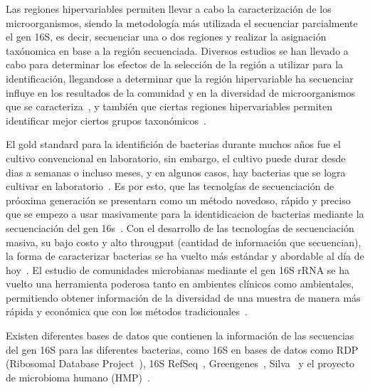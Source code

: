 Las regiones hipervariables permiten llevar a cabo la caracterización de los microorganismos, siendo la metodología más utilizada el secuenciar parcialmente el gen 16S, es decir, secuenciar una o dos regiones y realizar la asignación taxónomica en base a la región secuenciada. Diversos estudios se han llevado a cabo para determinar los efectos de la selección de la región a utilizar para la identificación, llegandose a determinar que la región hipervariable ha secuenciar influye en los resultados de la comunidad y en la diversidad de microorganismos que se caracteriza~\cite{klindworth2013evaluation,mizrahi2013taxonomic,guo2013taxonomic,soergel2012selection}, y también que ciertas regiones hipervariables permiten identificar mejor ciertos grupos taxonómicos~\cite{buscar}.




El gold standard para la identifición de bacterias durante muchos años fue el cultivo convencional en laboratorio, sin embargo, el cultivo puede durar desde dias a semanas o incluso meses, y en algunos casos, hay bacterias que se logra cultivar en laboratorio~\cite{didelot2012transforming}. Es por esto, que las tecnolgías de secuenciación de próoxima generación se presentarn como un método novedoso, rápido y preciso que se empezo a usar masivamente para la identidicacion de bacterias mediante la secuenciación del gen 16s~\cite{reller2007detection}.
Con el desarrollo de las tecnologías de secuenciación masiva, su bajo costo y alto througput (cantidad de información que secuencian), la forma de caracterizar bacterias se ha vuelto más estándar y abordable al día de hoy~\cite{woo2008then, tanner1994impact}. El estudio de comunidades microbianas mediante el gen 16S rRNA se ha vuelto una herramienta poderosa tanto en ambientes clínicos como ambientales, permitiendo obtener información de la diversidad de una muestra de manera más rápida y económica que con los métodos tradicionales~\cite{buscar}.

Existen diferentes bases de datos que contienen la información de las secuencias del gen 16S para las diferentes bacterias, como 16S en bases de datos como RDP (Ribosomal Database Project~\cite{cole2014ribosomal}), 16S RefSeq~\cite{}, Greengenes~\cite{desantis2006greengenes}, Silva~\cite{} y el proyecto de microbioma humano (HMP)~\cite{}.

